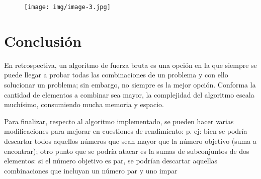 \documentclass[12pt, a4paper]{article} %
\begin{document}
\begin{figure}[h]
	\centering
	\texttt{[image: img/image-3.jpg]}
\end{figure}


\clearpage

\section{Conclusión}

En retrospectiva, un algoritmo de fuerza bruta es una opción en la que siempre se puede llegar a probar todas las combinaciones de un problema y con ello solucionar un problema; sin embargo, no siempre es la mejor opción. Conforma la cantidad de elementos a combinar sea mayor, la complejidad del algoritmo escala muchísimo, consumiendo mucha memoria y espacio.

Para finalizar, respecto al algoritmo implementado, se pueden hacer varias modificaciones para mejorar en cuestiones de rendimiento: p. ej: bien se podría descartar todos aquellos números que sean mayor que la número objetivo (suma a encontrar); otro punto que se podría atacar es la sumas de subconjuntos de dos elementos: si el número objetivo es par, se podrían descartar aquellas combinaciones que incluyan un número par y uno impar


\nocite{*} %

\clearpage


\end{document}
